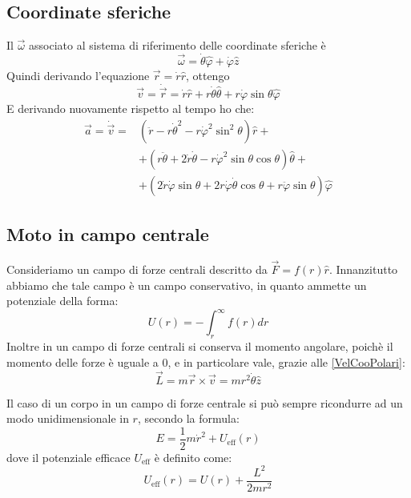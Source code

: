 \documentclass[../main.tex]{subfiles}
\begin{document}
\subsection{Coordinate sferiche}
Il $\vec\omega$ associato al sistema di riferimento delle coordinate sferiche è
\begin{equation}\label{OmegaSferiche}
	\vec{\omega}=\dot{\theta}\hat{\varphi}+\dot{\varphi}\hat{z}
\end{equation}
Quindi derivando l'equazione $\vec{r}=\dot{r}\hat{r}$, ottengo
\begin{equation}\label{VelCooSferiche}
	\vec{v} =\dot{\vec{r}}=\dot{r}\hat{r}+r\dot{\theta}\hat{\theta}+r\dot{\varphi}\sin{\theta}\hat{\varphi}
\end{equation}
E derivando nuovamente rispetto al tempo ho che:
\begin{equation}\label{AccCooSferiche}
\begin{split}
	\vec{a}=	\dot{\vec{v}}=	&\left(\ddot{r}-r\dot{\theta}^2-r\dot{\varphi}^2\sin^2\theta \right)\hat{r}+\\
													&	+\left( r\ddot{\theta}+2\dot{r}\dot{\theta}-r\dot{\varphi}^2\sin\theta\cos\theta \right)\hat{\theta}+\\
													&	+\left( 2\dot{r}\dot{\varphi}\sin\theta+2r\dot{\varphi}\dot{\theta}\cos\theta+r\ddot{\varphi}\sin\theta \right)\hat{\varphi}
\end{split}
\end{equation}

\subsection{Moto in campo centrale}
Consideriamo un campo di forze centrali descritto da $\vec{F}=f(r)\hat{r}$. 
Innanzitutto abbiamo che tale campo è un campo conservativo, in quanto ammette un potenziale della forma:
\begin{equation*}
	U(r)=-\int_r^\infty{f(r) dr}
\end{equation*}
Inoltre in un campo di forze centrali si conserva il momento angolare, poichè il momento delle forze è uguale a 0,
e in particolare vale, grazie alle \cref{VelCooPolari}:
\begin{equation*}
	\vec{L}=m\vec{r}\times\vec{v}=mr^2\dot{\theta}\hat{z}
\end{equation*}

Il caso di un corpo in un campo di forze centrale si può sempre ricondurre ad un modo unidimensionale in $r$, secondo la formula:
\begin{equation}\label{CentraleUnidimensionale}
	E=\frac 12m\dot{r}^2+U_{\text{eff}}(r)
\end{equation}
dove il potenziale efficace $U_{\text{eff}}$ è definito come:
\begin{equation}\label{PotenzialeEfficace}
	U_{\text{eff}}(r)=U(r)+\frac{L^2}{2mr^2}
\end{equation}
\end{document}

